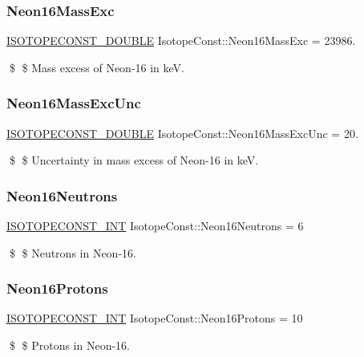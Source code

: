 \subsubsection{\texorpdfstring{Neon16\+Mass\+Exc}{Neon16MassExc}}
{\footnotesize\ttfamily \mbox{\hyperlink{group___isotope_const-_macros_ga8f45a7272ce02c0b4c65c44636ed719a}{I\+S\+O\+T\+O\+P\+E\+C\+O\+N\+S\+T\+\_\+\+D\+O\+U\+B\+LE}} Isotope\+Const\+::\+Neon16\+Mass\+Exc = 23986.}

\$ \$ Mass excess of Neon-\/16 in keV. \mbox{\label{group___isotope_const-_neon-_ne16_ga2b070c5d8557ece761c4e990e02cb424}} 
\subsubsection{\texorpdfstring{Neon16\+Mass\+Exc\+Unc}{Neon16MassExcUnc}}
{\footnotesize\ttfamily \mbox{\hyperlink{group___isotope_const-_macros_ga8f45a7272ce02c0b4c65c44636ed719a}{I\+S\+O\+T\+O\+P\+E\+C\+O\+N\+S\+T\+\_\+\+D\+O\+U\+B\+LE}} Isotope\+Const\+::\+Neon16\+Mass\+Exc\+Unc = 20.}

\$ \$ Uncertainty in mass excess of Neon-\/16 in keV. \mbox{\label{group___isotope_const-_neon-_ne16_gaf46b3aa8412eb8a56d8eb8cb25d52c4c}} 
\subsubsection{\texorpdfstring{Neon16\+Neutrons}{Neon16Neutrons}}
{\footnotesize\ttfamily \mbox{\hyperlink{group___isotope_const-_macros_ga5f18360b3e99483a35c32d789e62621c}{I\+S\+O\+T\+O\+P\+E\+C\+O\+N\+S\+T\+\_\+\+I\+NT}} Isotope\+Const\+::\+Neon16\+Neutrons = 6}

\$ \$ Neutrons in Neon-\/16. \mbox{\label{group___isotope_const-_neon-_ne16_ga93c9be27f12462e6d48768bd76e62c75}} 
\subsubsection{\texorpdfstring{Neon16\+Protons}{Neon16Protons}}
{\footnotesize\ttfamily \mbox{\hyperlink{group___isotope_const-_macros_ga5f18360b3e99483a35c32d789e62621c}{I\+S\+O\+T\+O\+P\+E\+C\+O\+N\+S\+T\+\_\+\+I\+NT}} Isotope\+Const\+::\+Neon16\+Protons = 10}

\$ \$ Protons in Neon-\/16. 